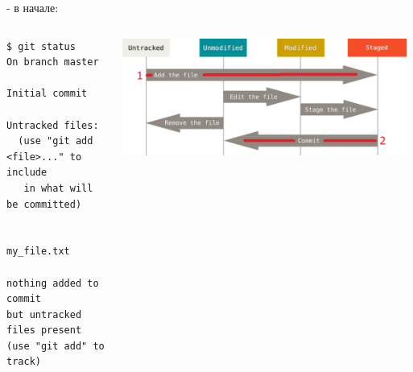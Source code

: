 \documentclass[presentation]{beamer}
\begin{document}
\begin{frame}[fragile,label={sec:org456e2ca}]{- в начале:}
 \begin{columns}
\begin{column}{0.65\columnwidth}
\begin{verbatim}
$ git status
On branch master

Initial commit

Untracked files:
  (use "git add <file>..." to include 
   in what will be committed)

        my_file.txt

nothing added to commit 
but untracked files present 
(use "git add" to track)
\end{verbatim}
\end{column}

\begin{column}{0.35\columnwidth}
\begin{center}
\includegraphics[width=0.98\textwidth]{./01_vcs_01_git_file_states_01_add.png}
\end{center}
\end{column}
\end{columns}
\end{frame}
\end{document}
